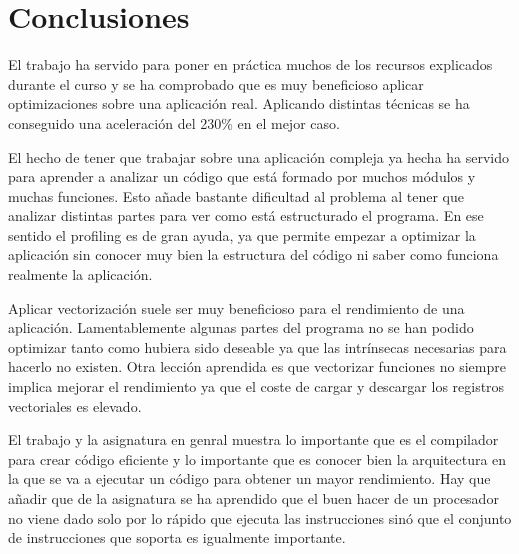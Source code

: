 \section{Conclusiones}

El trabajo ha servido para poner en pr\'{a}ctica muchos de los recursos
explicados durante el curso y se ha comprobado que es muy beneficioso aplicar
optimizaciones sobre una aplicaci\'{o}n real. Aplicando distintas t\'{e}cnicas
se ha conseguido una aceleraci\'{o}n del 230\% en el mejor caso.

El hecho de tener que trabajar sobre una aplicaci\'{o}n compleja ya hecha ha
servido para aprender a analizar un c\'{o}digo que est\'{a} formado por muchos
m\'{o}dulos y muchas funciones. Esto a\~{n}ade bastante dificultad al problema
al tener que analizar distintas partes para ver como est\'{a} estructurado el
programa. En ese sentido el profiling es de gran ayuda, ya que permite empezar
a optimizar la aplicaci\'{o}n sin conocer muy bien la estructura del c\'{o}digo
ni saber como funciona realmente la aplicaci\'{o}n.

Aplicar vectorizaci\'{o}n suele ser muy beneficioso para el rendimiento de una
aplicaci\'{o}n. Lamentablemente algunas partes del programa no se han podido
optimizar tanto como hubiera sido deseable ya que las intr\'{i}nsecas necesarias
para hacerlo no existen. Otra lecci\'{o}n aprendida es que vectorizar funciones
no siempre implica mejorar el rendimiento ya que el coste de cargar y descargar
los registros vectoriales es elevado.

El trabajo y la asignatura en genral muestra lo importante que es el compilador
para crear c\'{o}digo eficiente y lo importante que es conocer bien la
arquitectura en la que se va a ejecutar un c\'{o}digo para obtener un mayor
rendimiento. Hay que a\~{n}adir que de la asignatura se ha aprendido que el
buen hacer de un procesador no viene dado solo por lo r\'{a}pido que
ejecuta las instrucciones sin\'{o} que el conjunto de instrucciones que soporta
es igualmente importante.

